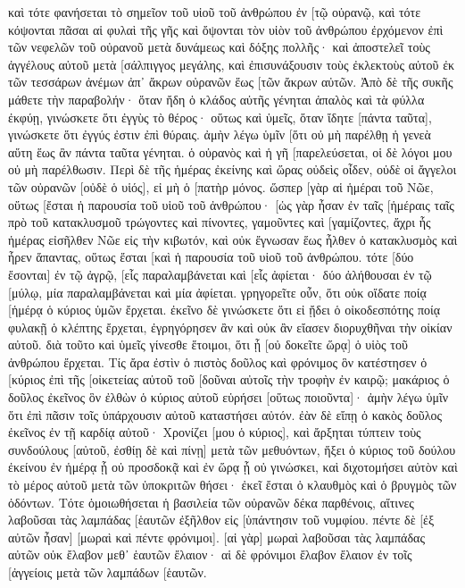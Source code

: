 καὶ τότε φανήσεται τὸ σημεῖον τοῦ υἱοῦ τοῦ ἀνθρώπου ἐν [τῷ οὐρανῷ, καὶ τότε κόψονται πᾶσαι αἱ φυλαὶ τῆς γῆς καὶ ὄψονται τὸν υἱὸν τοῦ ἀνθρώπου ἐρχόμενον ἐπὶ τῶν νεφελῶν τοῦ οὐρανοῦ μετὰ δυνάμεως καὶ δόξης πολλῆς· 
καὶ ἀποστελεῖ τοὺς ἀγγέλους αὐτοῦ μετὰ [σάλπιγγος μεγάλης, καὶ ἐπισυνάξουσιν τοὺς ἐκλεκτοὺς αὐτοῦ ἐκ τῶν τεσσάρων ἀνέμων ἀπ᾽ ἄκρων οὐρανῶν ἕως [τῶν ἄκρων αὐτῶν. 
Ἀπὸ δὲ τῆς συκῆς μάθετε τὴν παραβολήν· ὅταν ἤδη ὁ κλάδος αὐτῆς γένηται ἁπαλὸς καὶ τὰ φύλλα ἐκφύῃ, γινώσκετε ὅτι ἐγγὺς τὸ θέρος· 
οὕτως καὶ ὑμεῖς, ὅταν ἴδητε [πάντα ταῦτα], γινώσκετε ὅτι ἐγγύς ἐστιν ἐπὶ θύραις. 
ἀμὴν λέγω ὑμῖν [ὅτι οὐ μὴ παρέλθῃ ἡ γενεὰ αὕτη ἕως ἂν πάντα ταῦτα γένηται. 
ὁ οὐρανὸς καὶ ἡ γῆ [παρελεύσεται, οἱ δὲ λόγοι μου οὐ μὴ παρέλθωσιν. 
Περὶ δὲ τῆς ἡμέρας ἐκείνης καὶ ὥρας οὐδεὶς οἶδεν, οὐδὲ οἱ ἄγγελοι τῶν οὐρανῶν [οὐδὲ ὁ υἱός], εἰ μὴ ὁ [πατὴρ μόνος. 
ὥσπερ [γὰρ αἱ ἡμέραι τοῦ Νῶε, οὕτως [ἔσται ἡ παρουσία τοῦ υἱοῦ τοῦ ἀνθρώπου· 
[ὡς γὰρ ἦσαν ἐν ταῖς [ἡμέραις ταῖς πρὸ τοῦ κατακλυσμοῦ τρώγοντες καὶ πίνοντες, γαμοῦντες καὶ [γαμίζοντες, ἄχρι ἧς ἡμέρας εἰσῆλθεν Νῶε εἰς τὴν κιβωτόν, 
καὶ οὐκ ἔγνωσαν ἕως ἦλθεν ὁ κατακλυσμὸς καὶ ἦρεν ἅπαντας, οὕτως ἔσται [καὶ ἡ παρουσία τοῦ υἱοῦ τοῦ ἀνθρώπου. 
τότε [δύο ἔσονται] ἐν τῷ ἀγρῷ, [εἷς παραλαμβάνεται καὶ [εἷς ἀφίεται· 
δύο ἀλήθουσαι ἐν τῷ [μύλῳ, μία παραλαμβάνεται καὶ μία ἀφίεται. 
γρηγορεῖτε οὖν, ὅτι οὐκ οἴδατε ποίᾳ [ἡμέρᾳ ὁ κύριος ὑμῶν ἔρχεται. 
ἐκεῖνο δὲ γινώσκετε ὅτι εἰ ᾔδει ὁ οἰκοδεσπότης ποίᾳ φυλακῇ ὁ κλέπτης ἔρχεται, ἐγρηγόρησεν ἂν καὶ οὐκ ἂν εἴασεν διορυχθῆναι τὴν οἰκίαν αὐτοῦ. 
διὰ τοῦτο καὶ ὑμεῖς γίνεσθε ἕτοιμοι, ὅτι ᾗ [οὐ δοκεῖτε ὥρᾳ] ὁ υἱὸς τοῦ ἀνθρώπου ἔρχεται. 
Τίς ἄρα ἐστὶν ὁ πιστὸς δοῦλος καὶ φρόνιμος ὃν κατέστησεν ὁ [κύριος ἐπὶ τῆς [οἰκετείας αὐτοῦ τοῦ [δοῦναι αὐτοῖς τὴν τροφὴν ἐν καιρῷ; 
μακάριος ὁ δοῦλος ἐκεῖνος ὃν ἐλθὼν ὁ κύριος αὐτοῦ εὑρήσει [οὕτως ποιοῦντα]· 
ἀμὴν λέγω ὑμῖν ὅτι ἐπὶ πᾶσιν τοῖς ὑπάρχουσιν αὐτοῦ καταστήσει αὐτόν. 
ἐὰν δὲ εἴπῃ ὁ κακὸς δοῦλος ἐκεῖνος ἐν τῇ καρδίᾳ αὐτοῦ· Χρονίζει [μου ὁ κύριος], 
καὶ ἄρξηται τύπτειν τοὺς συνδούλους [αὐτοῦ, ἐσθίῃ δὲ καὶ πίνῃ] μετὰ τῶν μεθυόντων, 
ἥξει ὁ κύριος τοῦ δούλου ἐκείνου ἐν ἡμέρᾳ ᾗ οὐ προσδοκᾷ καὶ ἐν ὥρᾳ ᾗ οὐ γινώσκει, 
καὶ διχοτομήσει αὐτὸν καὶ τὸ μέρος αὐτοῦ μετὰ τῶν ὑποκριτῶν θήσει· ἐκεῖ ἔσται ὁ κλαυθμὸς καὶ ὁ βρυγμὸς τῶν ὀδόντων. 
Τότε ὁμοιωθήσεται ἡ βασιλεία τῶν οὐρανῶν δέκα παρθένοις, αἵτινες λαβοῦσαι τὰς λαμπάδας [ἑαυτῶν ἐξῆλθον εἰς [ὑπάντησιν τοῦ νυμφίου. 
πέντε δὲ [ἐξ αὐτῶν ἦσαν] [μωραὶ καὶ πέντε φρόνιμοι]. 
[αἱ γὰρ] μωραὶ λαβοῦσαι τὰς λαμπάδας αὐτῶν οὐκ ἔλαβον μεθ᾽ ἑαυτῶν ἔλαιον· 
αἱ δὲ φρόνιμοι ἔλαβον ἔλαιον ἐν τοῖς [ἀγγείοις μετὰ τῶν λαμπάδων [ἑαυτῶν. 
